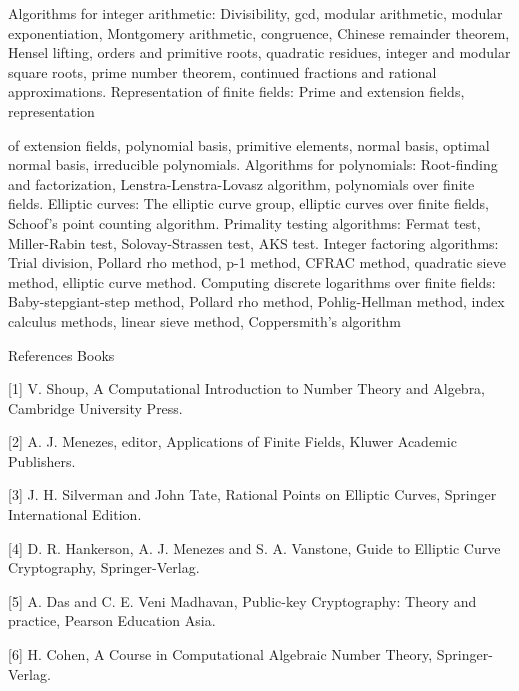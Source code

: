  

Algorithms for integer arithmetic: Divisibility, gcd, modular arithmetic, modular exponentiation, Montgomery arithmetic, congruence, Chinese remainder theorem, Hensel lifting, orders and primitive roots, quadratic residues, integer and modular square roots, prime number theorem, continued fractions and rational approximations. Representation of finite fields: Prime and extension fields, representation 

of extension fields, polynomial basis, primitive elements, normal basis, optimal normal basis, irreducible polynomials. Algorithms for polynomials: Root-finding and factorization, Lenstra-Lenstra-Lovasz algorithm, polynomials over finite fields. Elliptic curves: The elliptic curve group, elliptic curves over finite fields, Schoof’s point counting algorithm. Primality testing algorithms: Fermat test, Miller-Rabin test, Solovay-Strassen test, AKS test. Integer factoring algorithms: Trial division, Pollard rho method, p-1 method, CFRAC method, quadratic sieve method, elliptic curve method. Computing discrete logarithms over finite fields: Baby-stepgiant-step method, Pollard rho method, Pohlig-Hellman method, index calculus methods, linear sieve method, Coppersmith’s algorithm 

 

References Books 

[1] V. Shoup, A Computational Introduction to Number Theory and Algebra, Cambridge University Press. 

[2] A. J. Menezes, editor, Applications of Finite Fields, Kluwer Academic Publishers. 

[3] J. H. Silverman and John Tate, Rational Points on Elliptic Curves, Springer International Edition. 

[4] D. R. Hankerson, A. J. Menezes and S. A. Vanstone, Guide to Elliptic Curve Cryptography, Springer-Verlag. 

[5] A. Das and C. E. Veni Madhavan, Public-key Cryptography: Theory and practice, Pearson Education Asia. 

[6] H. Cohen, A Course in Computational Algebraic Number Theory, Springer-Verlag. 

 
\section{\dsccourseinfo}

